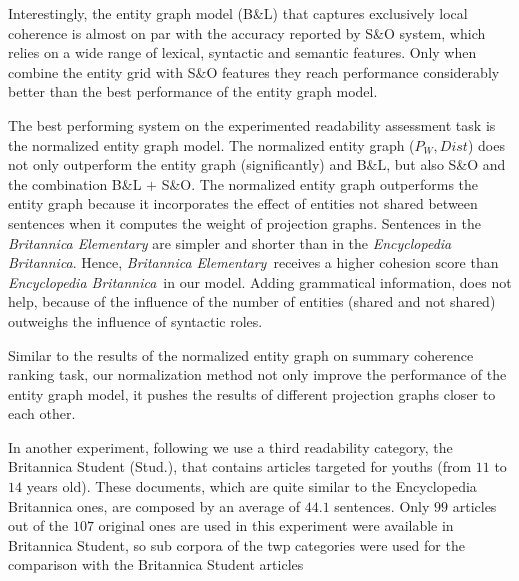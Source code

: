 Interestingly, the entity graph model (B\&L) that captures exclusively local coherence is almost on par with the accuracy reported by S\&O \cite{schwarm05} system, which relies on a wide range of lexical, syntactic and semantic features. 
Only when  combine the entity grid with S\&O features they reach performance considerably better than the best performance of the entity graph model. 

The best performing system on the experimented readability assessment task is the normalized entity graph model. 
The normalized entity graph ($P_W, Dist$) does not only outperform the entity graph (significantly) and B\&L, but also S\&O and the combination B\&L $+$ S\&O. 
The normalized entity graph outperforms the entity graph because it incorporates the effect of entities not shared between sentences when it computes the weight of projection graphs. 
Sentences in the \emph{Britannica Elementary} are simpler and shorter than in the \emph{Encyclopedia Britannica}.
Hence, \emph{Britannica Elementary}\ receives a higher cohesion score than \emph{Encyclopedia Britannica}\ in our
model. 
Adding grammatical information, does not help, because of the influence of the number of entities (shared and not shared) outweighs the influence of syntactic roles. 

Similar to the results of the normalized entity graph on summary coherence ranking task, our normalization method not only improve the performance of the entity graph model, it pushes the results of different projection graphs closer to each other. 

 
In another experiment, following \cite{guinaudeau13} we use a third readability category, the Britannica Student (Stud.), that contains articles targeted for youths (from $11$ to $14$ years old). 
These documents, which are quite similar to the Encyclopedia Britannica ones, are composed by an average of $44.1$ sentences. 
Only $99$ articles out of the $107$ original ones are used in this experiment were available in Britannica Student, so sub corpora of the twp categories were used for the comparison with the Britannica Student articles

